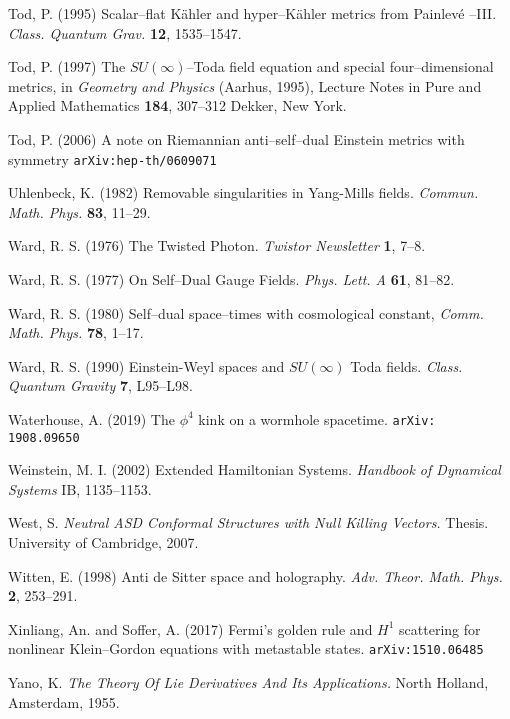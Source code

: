 \begin{thebibliography}{}
 Tod, P. (1995)
Scalar--flat K\"ahler and hyper--K\"ahler metrics from Painlev\'e --III.
\textit{Class. Quantum Grav.} {\bf 12}, 1535--1547.

 Tod, P. (1997)
The $SU(\infty)$--Toda field equation and special four--dimensional metrics,
in {\em Geometry and Physics} (Aarhus, 1995), Lecture Notes in Pure and Applied Mathematics {\bf 184}, 307--312 Dekker, New York.

 Tod, P. (2006) {A note on Riemannian anti--self--dual Einstein metrics with symmetry}
{\tt arXiv:hep-th/0609071}


 Uhlenbeck, K. (1982) Removable singularities in Yang-Mills fields.
\textit{Commun. Math. Phys.} {\bf 83}, 11--29.

 Ward, R. S. (1976)
The Twisted Photon.
\textit{Twistor Newsletter} {\bf 1}, 7--8.

 Ward, R. S. (1977)
On Self--Dual Gauge Fields.
\textit{Phys. Lett. A} {\bf 61}, 81--82.

   Ward, R. S. (1980)
Self--dual space--times with cosmological constant,
\textit{Comm. Math. Phys.} {\bf 78},  1--17.

 Ward, R. S. (1990) Einstein-Weyl spaces and 
$SU(\infty)$ Toda fields. \textit{Class. Quantum Gravity} {\bf 7}, L95--L98.

 Waterhouse, A. (2019)
The $\phi^4$ kink on a wormhole spacetime. {\tt arXiv: 1908.09650}

 Weinstein, M. I. (2002)
Extended Hamiltonian Systems. \textit{Handbook of Dynamical Systems} IB, 1135--1153.

 West, S. {\em Neutral ASD Conformal Structures with Null Killing Vectors.} Thesis. University of Cambridge, 2007.

 Witten, E. (1998)
Anti de Sitter space and holography. \textit{Adv. Theor. Math. Phys.} {\bf 2}, 253--291.

 Xinliang, An. and Soffer, A. (2017)
Fermi's golden rule and $H^1$ scattering for nonlinear Klein--Gordon equations with metastable states. {\tt arXiv:1510.06485}



 Yano, K. {\em The Theory Of Lie Derivatives And Its Applications.} North Holland, Amsterdam, 1955.


\end{thebibliography}
